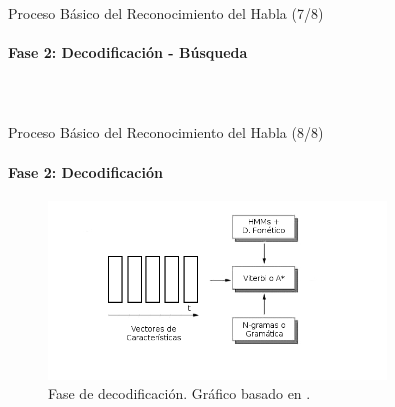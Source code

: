 \begin{frame}{Proceso B\'asico del Reconocimiento del Habla (7/8)}
\framesubtitle{Fase 2: Decodificaci\'on - B\'usqueda}

\begin{columns}

\begin{figure}[H]
\centering
{}
\label{figure:espacio-busqueda}
\end{figure}
\end{columns}


\end{frame}

\begin{frame}{Proceso B\'asico del Reconocimiento del Habla (8/8)}
\framesubtitle{Fase 2: Decodificaci\'on}
\begin{figure}[H] 
\centering
\includegraphics[width=0.8\textwidth]{./graphics/decodificacion0.png}
\caption{Fase de decodificaci\'on. Gr\'afico basado en \cite{VerenichASR}.}
\label{figure:decoding}
\end{figure}
\end{frame}


